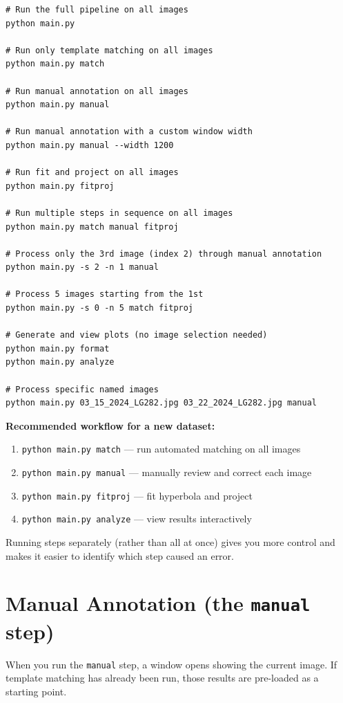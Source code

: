 \documentclass[11pt, letterpaper]{article}
\begin{document}
\begin{lstlisting}
# Run the full pipeline on all images
python main.py

# Run only template matching on all images
python main.py match

# Run manual annotation on all images
python main.py manual

# Run manual annotation with a custom window width
python main.py manual --width 1200

# Run fit and project on all images
python main.py fitproj

# Run multiple steps in sequence on all images
python main.py match manual fitproj

# Process only the 3rd image (index 2) through manual annotation
python main.py -s 2 -n 1 manual

# Process 5 images starting from the 1st
python main.py -s 0 -n 5 match fitproj

# Generate and view plots (no image selection needed)
python main.py format
python main.py analyze

# Process specific named images
python main.py 03_15_2024_LG282.jpg 03_22_2024_LG282.jpg manual
\end{lstlisting}

\begin{notebox}
\textbf{Recommended workflow for a new dataset:}
\begin{enumerate}[leftmargin=*, topsep=2pt, itemsep=2pt]
  \item \texttt{python main.py match} --- run automated matching on all images
  \item \texttt{python main.py manual} --- manually review and correct each image
  \item \texttt{python main.py fitproj} --- fit hyperbola and project
  \item \texttt{python main.py analyze} --- view results interactively
\end{enumerate}
Running steps separately (rather than all at once) gives you more control and makes it
easier to identify which step caused an error.
\end{notebox}

\section{Manual Annotation (the \texttt{manual} step)}

When you run the \texttt{manual} step, a window opens showing the current image. If
template matching has already been run, those results are pre-loaded as a starting point.
\end{document}
